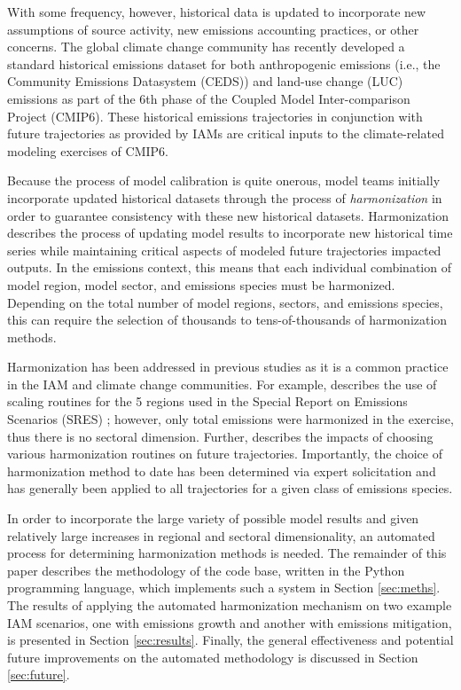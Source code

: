 With some frequency, however, historical data is updated to incorporate new
assumptions of source activity, new emissions accounting practices, or other
concerns. The global climate change community has recently developed a standard
historical emissions dataset for both anthropogenic emissions (i.e., the
Community Emissions Datasystem (CEDS)) \cite{hoesly_historical_2017} and
land-use change (LUC) emissions \cite{van_marle_historic_2017} as part of the
6th phase of the Coupled Model Inter-comparison Project (CMIP6). These
historical emissions trajectories in conjunction with future trajectories as
provided by IAMs are critical inputs to the climate-related modeling exercises
of CMIP6.

Because the process of model calibration is quite onerous, model teams initially
incorporate updated historical datasets through the process of
\textit{harmonization} in order to guarantee consistency with these new
historical datasets. Harmonization describes the process of updating model
results to incorporate new historical time series while maintaining critical
aspects of modeled future trajectories impacted outputs. In the emissions
context, this means that each individual combination of model region, model
sector, and emissions species must be harmonized. Depending on the total number
of model regions, sectors, and emissions species, this can require the selection
of thousands to tens-of-thousands of harmonization methods.

Harmonization has been addressed in previous studies as it is a common practice
in the IAM and climate change communities. For example,
\cite{meinshausen_rcp_2011} describes the use of scaling routines for the 5
regions used in the Special Report on Emissions Scenarios (SRES)
\cite{nakicenovic2000}; however, only total emissions were harmonized in the
exercise, thus there is no sectoral dimension. Further,
\cite{rogelj_discrepancies_2011} describes the impacts of choosing various
harmonization routines on future trajectories. Importantly, the choice of
harmonization method to date has been determined via expert solicitation and has
generally been applied to all trajectories for a given class of emissions
species.

In order to incorporate the large variety of possible model results and given
relatively large increases in regional and sectoral dimensionality, an automated
process for determining harmonization methods is needed. The remainder of this
paper describes the methodology of the  code base, written in the
Python programming language, which implements such a system in Section
\ref{sec:meths}. The results of applying the automated harmonization mechanism
on two example IAM scenarios, one with emissions growth and another with
emissions mitigation, is presented in Section \ref{sec:results}. Finally, the
general effectiveness and potential future improvements on the automated
methodology is discussed in Section \ref{sec:future}.

